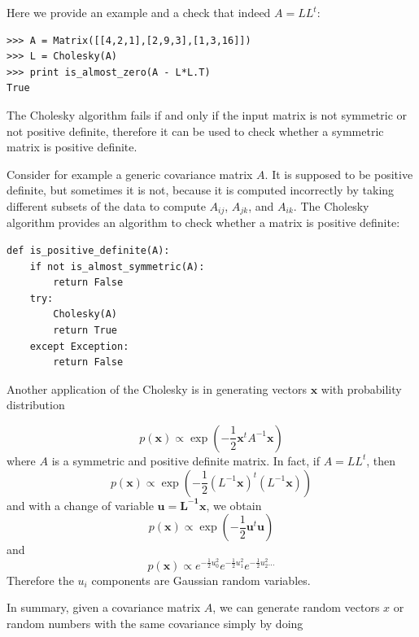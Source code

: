 \documentclass[justified,sixbynine]{tufte-book}
\def\ft{\small\tt}
\theoremstyle{plain}%
\theoremstyle{definition}
\theoremstyle{remark}
\begin{document}
\begin{fullwidth}
Here we provide an example and a check that indeed $A=L L^t$:

\begin{lstlisting}[caption={in file: {\ft nlib.py}}]
>>> A = Matrix([[4,2,1],[2,9,3],[1,3,16]])
>>> L = Cholesky(A)
>>> print is_almost_zero(A - L*L.T)
True
\end{lstlisting}

The Cholesky algorithm fails if and only if the input matrix is not symmetric or not positive definite, therefore it can be used to check whether a symmetric matrix is positive definite.

Consider for example a generic covariance matrix $A$. It is supposed to be positive definite, but sometimes it is not, because it is computed incorrectly by taking different subsets of the data to compute $A_{ij}$, $A_{jk}$, and $A_{ik}$. The Cholesky algorithm provides an algorithm to check whether a matrix is positive definite:

\begin{lstlisting}[caption={in file: {\ft nlib.py}}]
def is_positive_definite(A):
    if not is_almost_symmetric(A):
        return False
    try:
        Cholesky(A)
        return True
    except Exception:
        return False
\end{lstlisting}

Another application of the Cholesky is in generating vectors $\mathbf{x}$ with probability distribution

\begin{equation}
p(\mathbf{x}) \propto \exp\left(-\frac12 \mathbf{x}^t A^{-1} \mathbf{x}\right)
\end{equation}
where $A$ is a symmetric and positive definite matrix. In fact, if $A=LL^t$, then
\begin{equation}
p(\mathbf{x}) \propto \exp\left(-\frac12 (L^{-1}\mathbf{x})^t (L^{-1}\mathbf{x})\right)
\end{equation}
and with a change of variable $\mathbf{u}=\mathbf{L^{-1}x}$, we obtain
\begin{equation}
p(\mathbf{x}) \propto \exp\left(-\frac12 \mathbf{u}^t \mathbf{u}\right)
\end{equation}
and
\begin{equation}
p(\mathbf{x}) \propto e^{-\frac12 u_0^2}e^{-\frac12 u_1^2}e^{-\frac12 u_2^2\dots}
\end{equation}
Therefore the $u_i$ components are Gaussian random variables.

In summary, given a covariance matrix $A$, we can generate random vectors $x$ or random numbers with the same covariance simply by doing


\end{fullwidth}
\end{document}
